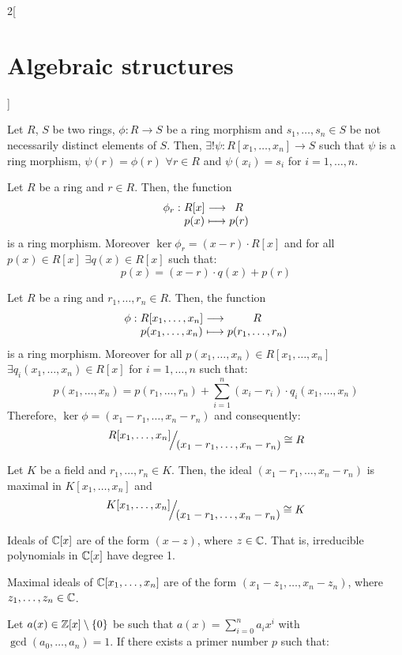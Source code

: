 \documentclass[../../../main_math.tex]{subfiles}
\begin{document}
\begin{multicols}{2}[\section{Algebraic structures}]
\begin{proposition}
  \end{proposition}
  \begin{proposition}
    Let $R$, $S$ be two rings, $\phi:R\rightarrow S$ be a ring morphism and $s_1,\ldots,s_n\in S$ be not necessarily distinct elements of $S$. Then, $\exists!\psi:R[x_1,\ldots,x_n]\rightarrow S$ such that $\psi$ is a ring morphism, $\psi(r)=\phi(r)$ $\forall r\in R$ and $\psi(x_i)=s_i$ for $i=1,\ldots,n$.
  \end{proposition}
  \begin{corollary}
    Let $R$ be a ring and $r\in R$. Then, the function
    $$\function{\phi_r}{R[x]}{R}{p(x)}{p(r)}$$
    is a ring morphism. Moreover $\ker\phi_r=(x-r)\cdot R[x]$ and for all $p(x)\in R[x]$ $\exists q(x)\in R[x]$ such that: $$p(x)=(x-r)\cdot q(x)+p(r)$$
  \end{corollary}
  \begin{corollary}
    Let $R$ be a ring and $r_1,\ldots,r_n\in R$. Then, the function
    $$\function{\phi}{R[x_1,\ldots,x_n]}{R}{p(x_1,\ldots,x_n)}{p(r_1,\ldots,r_n)}$$
    is a ring morphism. Moreover for all $p(x_1,\ldots,x_n)\in R[x_1,\ldots,x_n]$ $\exists q_i(x_1,\ldots,x_n)\in R[x]$ for $i=1,\ldots,n$ such that: $$p(x_1,\ldots,x_n)=p(r_1,\ldots,r_n)+\sum_{i=1}^n(x_i-r_i)\cdot q_i(x_1,\ldots,x_n)$$ Therefore, $\ker\phi=(x_1-r_1,\ldots,x_n-r_n)$ and consequently: $$\quot{R[x_1,\ldots,x_n]}{(x_1-r_1,\ldots,x_n-r_n)}\cong R$$
  \end{corollary}
  \begin{corollary}
    Let $K$ be a field and $r_1,\ldots,r_n\in K$. Then, the ideal $(x_1-r_1,\ldots,x_n-r_n)$ is maximal in $K[x_1,\ldots,x_n]$ and $$\quot{K[x_1,\ldots,x_n]}{(x_1-r_1,\ldots,x_n-r_n)}\cong K$$
  \end{corollary}
  \begin{theorem}
    Ideals of $\mathbb{C}[x]$ are of the form $(x-z)$, where $z\in\mathbb{C}$. That is, irreducible polynomials in $\mathbb{C}[x]$ have degree 1.
  \end{theorem}
  \begin{theorem}
    Maximal ideals of $\mathbb{C}[x_1,\ldots,x_n]$ are of the form $(x_1-z_1,\ldots,x_n-z_n)$, where $z_1,\ldots,z_n\in\mathbb{C}$.
  \end{theorem}
  \begin{theorem}
    Let $a(x)\in\mathbb{Z}[x]\setminus\{0\}$ be such that $a(x)=\sum_{i=0}^na_ix^i$ with $\gcd(a_0,\ldots,a_n)=1$. If there exists a primer number $p$ such that:

\end{theorem}
\end{multicols}
\end{document}
